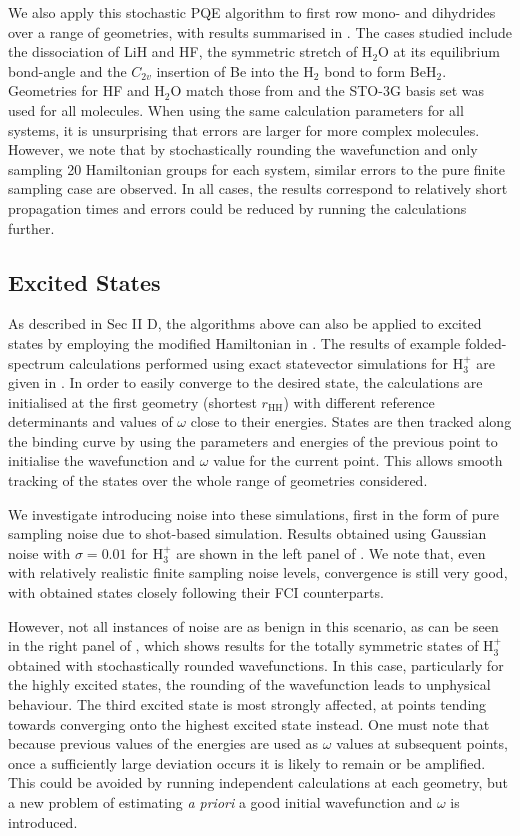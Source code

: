\documentclass[%
 reprint,
 amsmath,amssymb,
 aps,
]{revtex4-2}
\begin{document}
{We also apply this stochastic PQE algorithm to first row mono- and dihydrides over a range of geometries, with results summarised in . The cases studied include the dissociation of LiH and HF, the symmetric stretch of H$_2$O at its equilibrium bond-angle and the $C_{2v}$ insertion of Be into the H$_2$ bond to form BeH$_2$.\cite{Purvis1983}
Geometries for HF and H$_2$O match those from \cite{Das2010} and the STO-3G basis set was used for all molecules. When using the same calculation parameters for all systems, it is unsurprising that errors are larger for more complex molecules. However, we note that by stochastically rounding the wavefunction and only sampling 20 Hamiltonian groups for each system, similar errors to the pure finite sampling case are observed. In all cases, the results correspond to relatively short propagation times and errors could be reduced by running the calculations further.

\subsection{Excited States}

As described in Sec II D, the algorithms above can also be applied to excited states by employing the modified Hamiltonian in . The results of example folded-spectrum calculations  performed using exact statevector simulations for H$_3^+$ are given in . In order to easily converge to the desired state, the calculations are initialised at the first geometry (shortest $r_\mathrm{HH}$) with different reference determinants and values of $\omega$ close to their energies. 
States are then tracked along the binding curve by using the parameters and energies of the previous point to initialise the wavefunction and $\omega$ value for the current point. This allows smooth tracking of the states over the whole range of geometries considered.

We investigate introducing noise into these simulations, first in the form of pure sampling noise due to shot-based simulation. Results obtained using Gaussian noise with $\sigma = 0.01$ for  H$_3^+$ are shown in the left panel of . We note that, even with relatively realistic finite sampling noise levels, convergence is still very good, with obtained states closely following their FCI  counterparts.

However, not all instances of noise are as benign in this scenario, as can be seen in the right panel of , which shows results for the totally symmetric states of H$_3^+$ obtained with stochastically rounded wavefunctions. In this case, particularly for the highly excited states, the rounding of the wavefunction leads to unphysical behaviour. The third excited state is most strongly affected, at points tending towards converging onto the highest excited state instead. One must note that because previous values of the energies are used as $\omega$ values at subsequent points, once a sufficiently large deviation occurs it is likely to remain or be amplified. This could be avoided by running independent calculations at each geometry, but a new problem of estimating \textit{a priori} a good initial wavefunction and $\omega$ is introduced.

}
\end{document}

